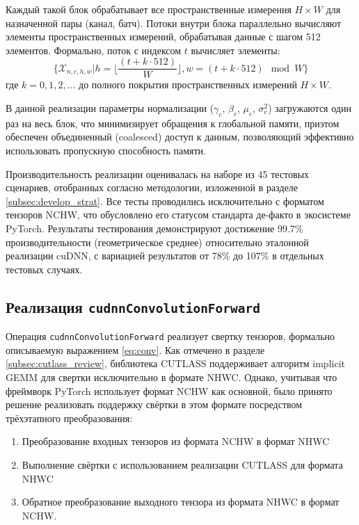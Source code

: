 Каждый такой блок обрабатывает все пространственные измерения $H \times W$ для назначенной пары (канал, батч). Потоки внутри блока параллельно вычисляют элементы
пространственных измерений, обрабатывая данные с шагом 512 элементов. Формально, поток с индексом $t$ вычисляет элементы:
\[
\{\mathcal{X}_{n,c,h,w} | h = \lfloor \frac{(t + k \cdot 512)}{W} \rfloor, w = (t + k \cdot 512)\mod W \}
\]
где $k = 0,1,2,\dots$ до полного покрытия пространственных измерений $H \times W$.

В данной реализации параметры нормализации ($\gamma_c$, $\beta_c$, $\mu_c$, $\sigma_c^2$) загружаются один раз на весь блок, что минимизирует обращения к глобальной
памяти, приэтом обеспечен объединенный (coalesced) доступ к данным, позволяющий эффективно использовать пропускную способность памяти.

Производительность реализации оценивалась на наборе из 45 тестовых сценариев, отобранных согласно методологии, изложенной в разделе \ref{subsec:develop_strat}.
Все тесты проводились исключительно с форматом тензоров NCHW, что обусловлено его статусом стандарта де-факто в экосистеме PyTorch.
Результаты тестирования демонстрируют достижение 99.7\% производительности (геометрическое среднее) относительно эталонной реализации cuDNN,
с вариацией результатов от 78\% до 107\% в отдельных тестовых случаях.

\subsection{Реализация \texttt{cudnnConvolutionForward}}
Операция \texttt{cudnnConvolutionForward} реализует свертку тензоров, формально описываемую выражением \eqref{eq:conv}.
Как отмечено в разделе \ref{subsec:cutlass_review}, библиотека CUTLASS поддерживает алгоритм implicit GEMM для свертки
исключительно в формате NHWC. Однако, учитывая что фреймворк PyTorch использует формат NCHW как основной, было принято
решение реализовать поддержку свёртки в этом формате посредством трёхэтапного преобразования:
\begin{enumerate}
\item Преобразование входных тензоров из формата NCHW в формат NHWC
\item Выполнение свёртки с использованием реализации CUTLASS для формата NHWC
\item Обратное преобразование выходного тензора из формата NHWC в формат NCHW.
\end{enumerate}

